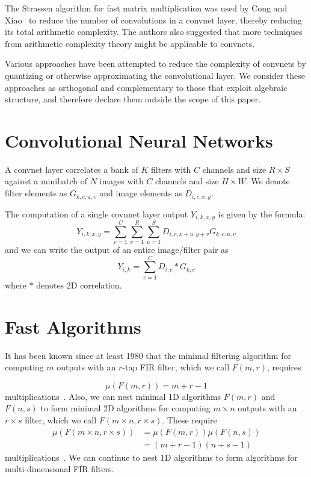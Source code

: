 \documentclass[10pt,twocolumn,letterpaper]{article}
\begin{document}
The Strassen algorithm for fast matrix multiplication was used by Cong and Xiao~\cite{cong2014minimizing} to reduce the number of convolutions in a convnet layer, thereby reducing its total arithmetic complexity. The authors also suggested that more techniques from arithmetic complexity theory might be applicable to convnets.

Various approaches have been attempted to reduce the complexity of convnets by quantizing or otherwise approximating the convolutional layer. We consider these approaches as orthogonal and complementary to those that exploit algebraic structure, and therefore declare them outside the scope of this paper.

\section{Convolutional Neural Networks}

A convnet layer correlates a bank of $K$ filters with $C$ channels and size $R \times S$ against a minibatch of $N$ images with $C$ channels and size $H \times W$. We denote filter elements as $G_{k,c,u,v}$ and image elements as $D_{i,c,x,y}$.

The computation of a single covnnet layer output $Y_{i,k,x,y}$ is given by the formula:
\begin{equation}\label{eq:convnetdirect}
Y_{i,k,x,y} = \sum\limits_{c=1}^{C} \sum\limits_{v=1}^{R} \sum\limits_{u=1}^{S} D_{i,c,x+u,y+v} G_{k,c,u,v}
\end{equation}
and we can write the output of an entire image/filter pair as
\begin{equation}\label{eq:convnetcorrelation}
Y_{i,k} = \sum\limits_{c=1}^{C} D_{i,c} \ast G_{k,c}
\end{equation}
where $\ast$ denotes 2D correlation.

\section{Fast Algorithms}

It has been known since at least 1980 that the minimal filtering algorithm for computing $m$ outputs with an $r$-tap FIR filter, which we call $F(m,r)$, requires

\begin{equation}
\mu(F(m,r)) = m+r-1
\end{equation}
multiplications~\cite[p.~39]{winograd1980arithmetic}. Also, we can nest minimal 1D algorithms $F(m,r)$ and $F(n,s)$ to form minimal 2D algorithms for computing $m\times n$ outputs with an $r \times s$ filter, which we call $F(m \times n, r \times s)$. These require
\begin{equation}
\begin{split}
\mu (F(m \times n,r \times s)) &= \mu(F(m,r)) \mu(F(n,s)) \\
&= (m+r-1)(n+s-1)
\end{split}
\end{equation}
multiplications~\cite{winograd1980multiplication}. We can continue to nest 1D algorithms to form algorithms for multi-dimensional FIR filters.
\end{document}
